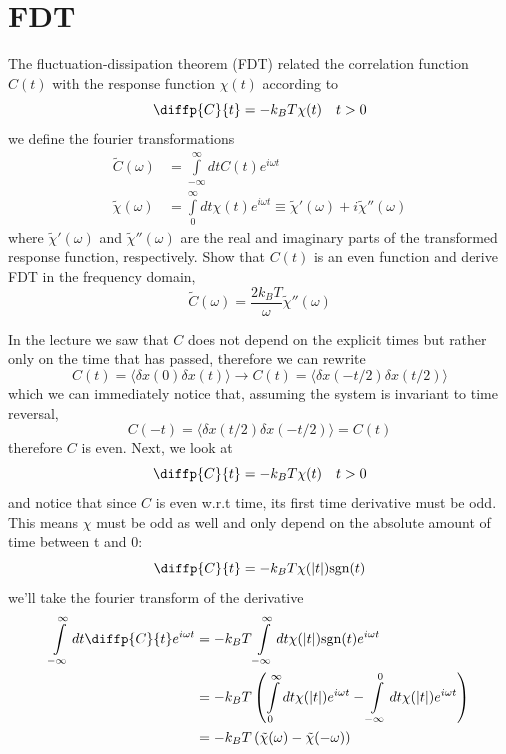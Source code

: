 \clearpage
\section{FDT}
\begin{colbox}
	The fluctuation-dissipation theorem (FDT) related the correlation function $C(t)$ with the response function $\chi(t)$ according to
	\begin{equation}\label{diffC}
		\diffp{C}{t} = -k_BT\chi(t) \quad t>0
	\end{equation}
	we define the fourier transformations
	\begin{align}
		\tilde C(\omega) &= \int\limits_{-\infty}^\infty dt C(t)e^{i\omega t}\\
		\tilde \chi(\omega) &= \int\limits_0^\infty dt \chi(t)e^{i\omega t} \equiv \tilde \chi'(\omega)+i\tilde\chi''(\omega)
	\end{align}
	where $\tilde\chi'(\omega)$ and $\tilde\chi''(\omega)$ are the real and imaginary parts of the transformed response function, respectively. Show that $C(t)$ is an even function and derive FDT in the frequency domain,
	\begin{equation}
		\tilde C(\omega) = \frac{2k_BT}{\omega}\tilde\chi''(\omega)
	\end{equation}
\end{colbox}
In the lecture we saw that $C$ does not depend on the explicit times but rather only on the time that has passed, therefore we can rewrite
\begin{equation}
	C(t) = \langle\delta x(0)\delta x(t)\rangle \rightarrow C(t) = \langle\delta x(-t/2)\delta x(t/2)\rangle
\end{equation}
which we can immediately notice that, assuming the system is invariant to time reversal,
\begin{equation}
	C(-t) = \langle\delta x(t/2)\delta x(-t/2)\rangle = C(t)
\end{equation}
therefore $C$ is even. Next, we look at
\begin{equation}
	\diffp{C}{t} = -k_BT\chi(t) \quad t>0
\end{equation}
and notice that since $C$ is even w.r.t time, its first time derivative must be odd. This means $\chi$ must be odd as well and only depend on the absolute amount of time between t and 0:
\begin{equation}
	\diffp{C}{t} = -k_BT\chi(\lvert t \rvert)\text{sgn}(t)
\end{equation}
we'll take the fourier transform of the derivative
\begin{align}
	\int\limits_{-\infty}^\infty dt \diffp{C}{t}e^{i\omega t} &= -k_BT\int\limits_{-\infty}^\infty dt \chi(\lvert t \rvert)\text{sgn}(t)e^{i\omega t}\\
	&= -k_BT\ins{\int\limits_0^\infty dt \chi(\lvert t \rvert)e^{i\omega t}-\int\limits_{-\infty}^0 dt \chi(\lvert t \rvert)e^{i\omega t}}\\
	&= -k_BT\ins{\tilde\chi(\omega)-\tilde\chi(-\omega)}
\end{align}
